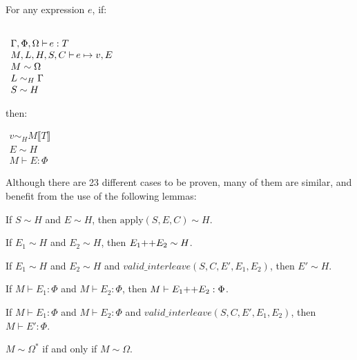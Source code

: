 \begin{thm}
For any expression $e$, if:
\begin{center}
$
\begin{array}{l} \\
\typeenv{e}{T} \\
\opsenv{e}{v}{E} \\
M \sim \Omega \\
L \sim_H \Gamma \\
S \sim H
\end{array}
$
\end{center}
then:
\begin{center}
$
\begin{array}{l}
v \sim_H M \llbracket T \rrbracket \\
E \sim H \\
M \vdash E : \Phi
\end{array}
$
\end{center}
\end{thm}

Although there are 23 different cases to be proven, many of them are similar, and benefit from
the use of the following lemmas:

\begin{lem}
\label{lemma:heapconst:apply}
If $S \sim H$ and $E \sim H$, then $\text{apply}(S, E, C) \sim H$.
\end{lem}

\begin{lem}
\label{lemma:heapconst:effects1}
If $E_1 \sim H$ and $E_2 \sim H$, then $E_1 \text{++} E_2 \sim H$.
\end{lem}

\begin{lem}
\label{lemma:heapconst:effects2}
If $E_1 \sim H$ and $E_2 \sim H$ and $valid\_interleave(S, C, E', E_1, E_2)$, then $E' \sim H$.
\end{lem}

\begin{lem}
\label{lemma:effsound:effects1}
If $M \vdash E_1 : \Phi$ and $M \vdash E_2 : \Phi$, then $M \vdash E_1 \text{++} E_2 : \Phi$.
\end{lem}

\begin{lem}
\label{lemma:effsound:effects2}
If $M \vdash E_1 : \Phi$ and $M \vdash E_2 : \Phi$ and $valid\_interleave(S, C, E', E_1, E_2)$, then $M \vdash E' : \Phi$.
\end{lem}

\begin{lem}
\label{lemma:omegaclosure}
$M \sim \Omega^*$ if and only if $M \sim \Omega$.
\end{lem}

